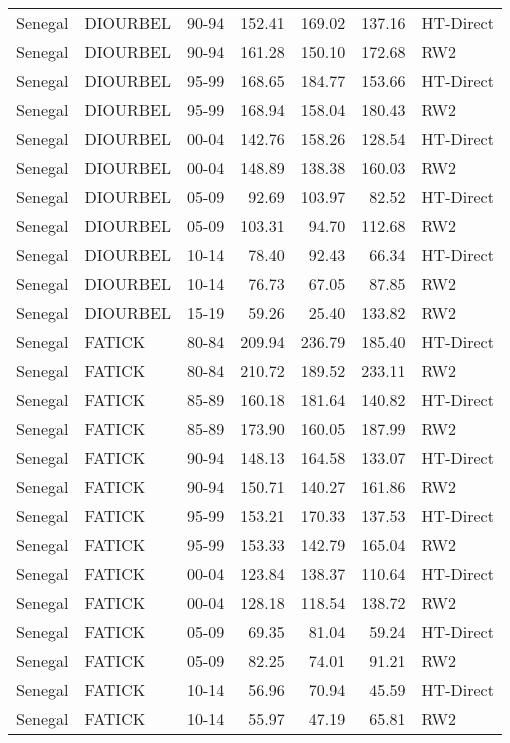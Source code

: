 \begin{longtable}{lllrrrl}
  Senegal & DIOURBEL & 90-94 & 152.41 & 169.02 & 137.16 & HT-Direct \\ 
  Senegal & DIOURBEL & 90-94 & 161.28 & 150.10 & 172.68 & RW2 \\ 
  Senegal & DIOURBEL & 95-99 & 168.65 & 184.77 & 153.66 & HT-Direct \\ 
  Senegal & DIOURBEL & 95-99 & 168.94 & 158.04 & 180.43 & RW2 \\ 
  Senegal & DIOURBEL & 00-04 & 142.76 & 158.26 & 128.54 & HT-Direct \\ 
  Senegal & DIOURBEL & 00-04 & 148.89 & 138.38 & 160.03 & RW2 \\ 
  Senegal & DIOURBEL & 05-09 & 92.69 & 103.97 & 82.52 & HT-Direct \\ 
  Senegal & DIOURBEL & 05-09 & 103.31 & 94.70 & 112.68 & RW2 \\ 
  Senegal & DIOURBEL & 10-14 & 78.40 & 92.43 & 66.34 & HT-Direct \\ 
  Senegal & DIOURBEL & 10-14 & 76.73 & 67.05 & 87.85 & RW2 \\ 
  Senegal & DIOURBEL & 15-19 & 59.26 & 25.40 & 133.82 & RW2 \\ 
  Senegal & FATICK & 80-84 & 209.94 & 236.79 & 185.40 & HT-Direct \\ 
  Senegal & FATICK & 80-84 & 210.72 & 189.52 & 233.11 & RW2 \\ 
  Senegal & FATICK & 85-89 & 160.18 & 181.64 & 140.82 & HT-Direct \\ 
  Senegal & FATICK & 85-89 & 173.90 & 160.05 & 187.99 & RW2 \\ 
  Senegal & FATICK & 90-94 & 148.13 & 164.58 & 133.07 & HT-Direct \\ 
  Senegal & FATICK & 90-94 & 150.71 & 140.27 & 161.86 & RW2 \\ 
  Senegal & FATICK & 95-99 & 153.21 & 170.33 & 137.53 & HT-Direct \\ 
  Senegal & FATICK & 95-99 & 153.33 & 142.79 & 165.04 & RW2 \\ 
  Senegal & FATICK & 00-04 & 123.84 & 138.37 & 110.64 & HT-Direct \\ 
  Senegal & FATICK & 00-04 & 128.18 & 118.54 & 138.72 & RW2 \\ 
  Senegal & FATICK & 05-09 & 69.35 & 81.04 & 59.24 & HT-Direct \\ 
  Senegal & FATICK & 05-09 & 82.25 & 74.01 & 91.21 & RW2 \\ 
  Senegal & FATICK & 10-14 & 56.96 & 70.94 & 45.59 & HT-Direct \\ 
  Senegal & FATICK & 10-14 & 55.97 & 47.19 & 65.81 & RW2 \\ 

\end{longtable}
